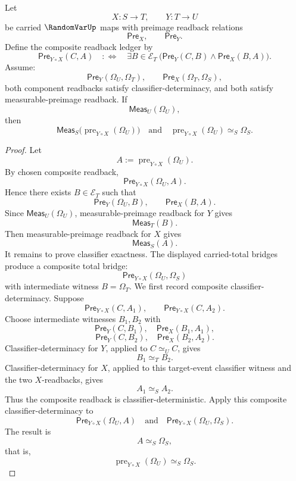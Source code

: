 \begin{theorem}
\label{thm:randomvar-composition-preserves-total-event-preimage-exactness}
Let
$$
X:S\to T,
\qquad
Y:T\to U
$$
be carried $\RandomVarUp$ maps with preimage readback relations
$$
\mathsf{Pre}_X,
\qquad
\mathsf{Pre}_Y.
$$
Define the composite readback ledger by
$$
\mathsf{Pre}_{Y\circ X}(C,A)
\quad:\Longleftrightarrow\quad
\exists B\in\mathcal E_T\ 
\bigl(\mathsf{Pre}_Y(C,B)\wedge \mathsf{Pre}_X(B,A)\bigr).
$$
Assume:
$$
\mathsf{Pre}_Y(\Omega_U,\Omega_T),
\qquad
\mathsf{Pre}_X(\Omega_T,\Omega_S),
$$
both component readbacks satisfy classifier-determinacy, and both satisfy measurable-preimage readback. If
$$
\mathsf{Meas}_U(\Omega_U),
$$
then
$$
\mathsf{Meas}_S\bigl(\operatorname{pre}_{Y\circ X}(\Omega_U)\bigr)
\quad\text{and}\quad
\operatorname{pre}_{Y\circ X}(\Omega_U)\simeq_S\Omega_S.
$$
\end{theorem}
\begin{proof}
Let
$$
A:=\operatorname{pre}_{Y\circ X}(\Omega_U).
$$
By chosen composite readback,
$$
\mathsf{Pre}_{Y\circ X}(\Omega_U,A).
$$
Hence there exists $B\in\mathcal E_T$ such that
$$
\mathsf{Pre}_Y(\Omega_U,B),
\qquad
\mathsf{Pre}_X(B,A).
$$
Since $\mathsf{Meas}_U(\Omega_U)$, measurable-preimage readback for $Y$ gives
$$
\mathsf{Meas}_T(B).
$$
Then measurable-preimage readback for $X$ gives
$$
\mathsf{Meas}_S(A).
$$
It remains to prove classifier exactness. The displayed carried-total bridges produce a composite total bridge:
$$
\mathsf{Pre}_{Y\circ X}(\Omega_U,\Omega_S)
$$
with intermediate witness $B=\Omega_T$.
We first record composite classifier-determinacy. Suppose
$$
\mathsf{Pre}_{Y\circ X}(C,A_1),
\qquad
\mathsf{Pre}_{Y\circ X}(C,A_2).
$$
Choose intermediate witnesses $B_1,B_2$ with
$$
\mathsf{Pre}_Y(C,B_1),\quad \mathsf{Pre}_X(B_1,A_1),
$$
$$
\mathsf{Pre}_Y(C,B_2),\quad \mathsf{Pre}_X(B_2,A_2).
$$
Classifier-determinacy for $Y$, applied to $C\simeq_U C$, gives
$$
B_1\simeq_T B_2.
$$
Classifier-determinacy for $X$, applied to this target-event classifier witness and the two $X$-readbacks, gives
$$
A_1\simeq_S A_2.
$$
Thus the composite readback is classifier-deterministic.
Apply this composite classifier-determinacy to
$$
\mathsf{Pre}_{Y\circ X}(\Omega_U,A)
\quad\text{and}\quad
\mathsf{Pre}_{Y\circ X}(\Omega_U,\Omega_S).
$$
The result is
$$
A\simeq_S\Omega_S,
$$
that is,
$$
\operatorname{pre}_{Y\circ X}(\Omega_U)\simeq_S\Omega_S.
$$
\end{proof}

